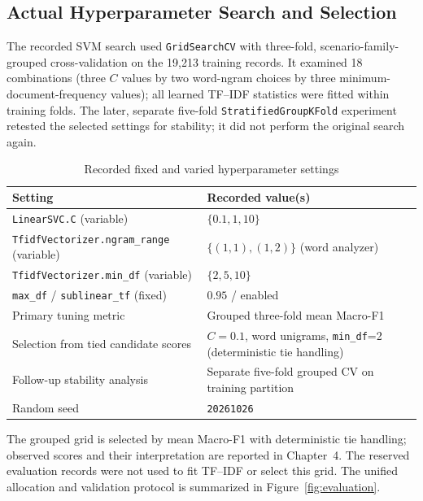 \subsection{Actual Hyperparameter Search and Selection}
The recorded SVM search used \texttt{GridSearchCV} with three-fold, scenario-family-grouped cross-validation on the 19,213 training records. It examined 18 combinations (three $C$ values by two word-ngram choices by three minimum-document-frequency values); all learned TF--IDF statistics were fitted within training folds. The later, separate five-fold \texttt{StratifiedGroupKFold} experiment retested the selected settings for stability; it did not perform the original search again.
\begin{table}[H]\centering\caption{Recorded fixed and varied hyperparameter settings}\label{tab:m2grid}\small\begin{tabularx}{\textwidth}{p{}X}\toprule
Setting & Recorded value(s)\\\midrule
\texttt{LinearSVC.C} (variable) & $\{0.1,1,10\}$\\
\texttt{TfidfVectorizer.ngram\_range} (variable) & $\{(1,1),(1,2)\}$ (word analyzer)\\
\texttt{TfidfVectorizer.min\_df} (variable) & $\{2,5,10\}$\\
\texttt{max\_df} / \texttt{sublinear\_tf} (fixed) & $0.95$ / enabled\\
Primary tuning metric & Grouped three-fold mean Macro-F1\\
Selection from tied candidate scores & $C=0.1$, word unigrams, \texttt{min\_df}=2 (deterministic tie handling)\\
Follow-up stability analysis & Separate five-fold grouped CV on training partition\\
Random seed & \texttt{20261026}\\\bottomrule
\end{tabularx}\end{table}
The grouped grid is selected by mean Macro-F1 with deterministic tie handling; observed scores and their interpretation are reported in Chapter~4. The reserved evaluation records were not used to fit TF--IDF or select this grid. The unified allocation and validation protocol is summarized in Figure~\ref{fig:evaluation}.

